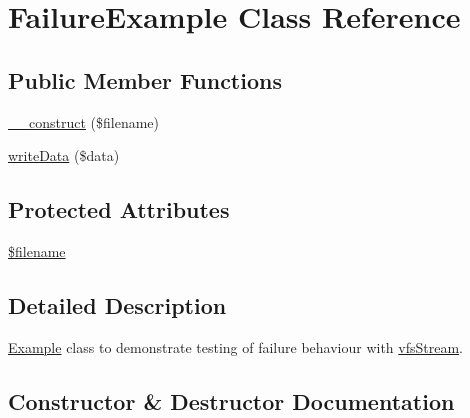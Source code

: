 \hypertarget{classorg_1_1bovigo_1_1vfs_1_1example_1_1_failure_example}{}\section{Failure\+Example Class Reference}
\label{classorg_1_1bovigo_1_1vfs_1_1example_1_1_failure_example}
\subsection*{Public Member Functions}
\begin{DoxyCompactItemize}
\item 
\mbox{\hyperlink{classorg_1_1bovigo_1_1vfs_1_1example_1_1_failure_example_a3387125924c13e72878c47ecad75faca}{\+\_\+\+\_\+construct}} (\$filename)
\item 
\mbox{\hyperlink{classorg_1_1bovigo_1_1vfs_1_1example_1_1_failure_example_ae6b756514b45098dbc61fe686ce9c4ff}{write\+Data}} (\$data)
\end{DoxyCompactItemize}
\subsection*{Protected Attributes}
\begin{DoxyCompactItemize}
\item 
\mbox{\hyperlink{classorg_1_1bovigo_1_1vfs_1_1example_1_1_failure_example_a0722441477f957078ee2437054556cbc}{\$filename}}
\end{DoxyCompactItemize}


\subsection{Detailed Description}
\mbox{\hyperlink{classorg_1_1bovigo_1_1vfs_1_1example_1_1_example}{Example}} class to demonstrate testing of failure behaviour with \mbox{\hyperlink{classorg_1_1bovigo_1_1vfs_1_1vfs_stream}{vfs\+Stream}}. 

\subsection{Constructor \& Destructor Documentation}
\mbox{\label{classorg_1_1bovigo_1_1vfs_1_1example_1_1_failure_example_a3387125924c13e72878c47ecad75faca}} 
